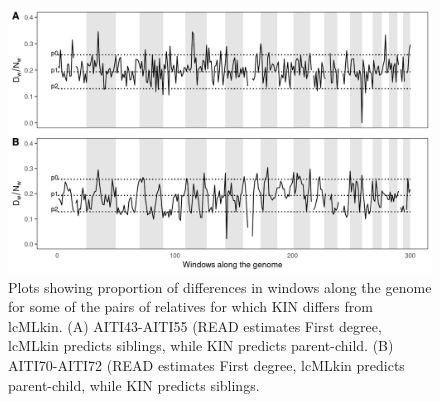\documentclass[12pt, letterpaper]{article}
\begin{document}
\begin{figure}[h]
    \centering
    \includegraphics[width=18cm]{supplementary_info/plots/egplot2.png}
    \caption{Plots showing proportion of differences in windows along the genome for some of the pairs of relatives for which KIN differs from lcMLkin. (A) AITI43-AITI55 (READ estimates First degree, lcMLkin predicts siblings, while KIN predicts parent-child. (B) AITI70-AITI72 (READ estimates First degree, lcMLkin predicts parent-child, while KIN predicts siblings.}
    \label{figS9:eg2}
\end{figure}
\end{document}

